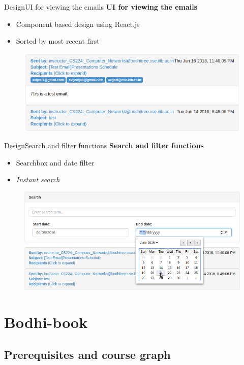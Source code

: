 \documentclass[xcolor=table]{beamer}
\begin{document}
\begin{frame}{Design}{UI for viewing the emails}
	\textbf{UI for viewing the emails}
	\begin{itemize}
		\item Component based design using React.js
		\item Sorted by most recent first
	\end{itemize}
	\begin{figure}
		\centering
		\includegraphics[width=0.8\linewidth]{media/email_ui} \\
		\label{fig:email_ui}
	\end{figure}
\end{frame}

\begin{frame}{Design}{Search and filter functions}
	\textbf{Search and filter functions}
	\begin{itemize}
		\item Searchbox and date filter
		\item \textit{Instant search}
	\end{itemize}
	\begin{figure}
		\centering
		\includegraphics[width=0.8\linewidth]{media/email_search} \\
		\label{fig:email_search}
	\end{figure}
\end{frame}

\section{Bodhi-book}

\subsection{Prerequisites and course graph}
\end{document}
